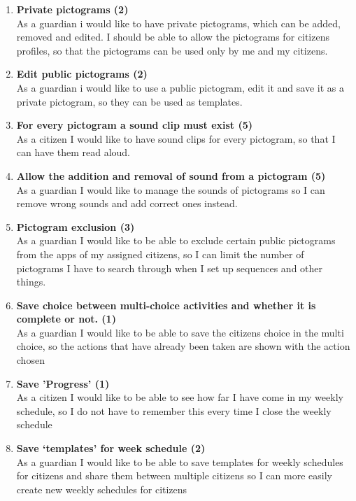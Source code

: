 \begin{enumerate}
	\item \textbf{Private pictograms (2)}\\
	As a guardian i would like to have private pictograms, which can be added, removed and edited. I should be able to allow the pictograms for citizens profiles, so that the pictograms can be used only by me and my citizens.
	
	\item \textbf{Edit public pictograms (2)}\\
	As a guardian i would like to use a public pictogram, edit it and save it as a private pictogram, so they can be used as templates.
	
	\item \textbf{For every pictogram a sound clip must exist (5)}\\
	As a citizen I would like to have sound clips for every pictogram, so that I can have them read aloud.
	
	\item \textbf{Allow the addition and removal of sound from a pictogram (5)}\\
	As a guardian I would like to manage the sounds of pictograms so I can remove wrong sounds and add correct ones instead.
	
	\item \textbf{Pictogram exclusion (3)}\\
	As a guardian I would like to be able to exclude certain public pictograms from the apps of my assigned citizens, so I can limit the number of pictograms I have to search through when I set up sequences and other things.
	
	\item \textbf{Save choice between multi-choice activities and whether it is complete or not. (1)}\\
	As a guardian I would like to be able to save the citizens choice in the multi choice, so the actions that have already been taken are shown with the action chosen
	
	\item \textbf{Save 'Progress' (1)}\\
	As a citizen I would like to be able to see how far I have come in my weekly schedule, so I do not have to remember this every time I close the weekly schedule
	
	\item \textbf{Save ‘templates’ for week schedule (2)}\\
	As a guardian I would like to be able to save templates for weekly schedules for citizens and share them between multiple citizens so I can more easily create new weekly schedules for citizens
	

\end{enumerate}
